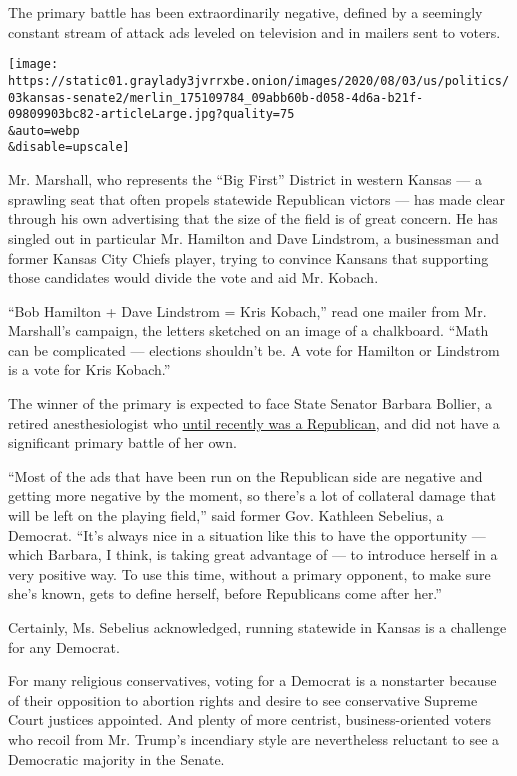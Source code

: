 The primary battle has been extraordinarily negative, defined by a
seemingly constant stream of attack ads leveled on television and in
mailers sent to voters.

\texttt{[image: https://static01.graylady3jvrrxbe.onion/images/2020/08/03/us/politics/03kansas-senate2/merlin\_175109784\_09abb60b-d058-4d6a-b21f-09809903bc82-articleLarge.jpg?quality=75\\\&auto=webp\\\&disable=upscale]}

Mr. Marshall, who represents the ``Big First'' District in western
Kansas --- a sprawling seat that often propels statewide Republican
victors --- has made clear through his own advertising that the size of
the field is of great concern. He has singled out in particular Mr.
Hamilton and Dave Lindstrom, a businessman and former Kansas City Chiefs
player, trying to convince Kansans that supporting those candidates
would divide the vote and aid Mr. Kobach.

``Bob Hamilton + Dave Lindstrom = Kris Kobach,'' read one mailer from
Mr. Marshall's campaign, the letters sketched on an image of a
chalkboard. ``Math can be complicated --- elections shouldn't be. A vote
for Hamilton or Lindstrom is a vote for Kris Kobach.''

The winner of the primary is expected to face State Senator Barbara
Bollier, a retired anesthesiologist who
\href{https://www.kansas.com/news/politics-government/article222990385.html}{until
recently was a Republican}, and did not have a significant primary
battle of her own.

``Most of the ads that have been run on the Republican side are negative
and getting more negative by the moment, so there's a lot of collateral
damage that will be left on the playing field,'' said former Gov.
Kathleen Sebelius, a Democrat. ``It's always nice in a situation like
this to have the opportunity --- which Barbara, I think, is taking great
advantage of --- to introduce herself in a very positive way. To use
this time, without a primary opponent, to make sure she's known, gets to
define herself, before Republicans come after her.''

Certainly, Ms. Sebelius acknowledged, running statewide in Kansas is a
challenge for any Democrat.

For many religious conservatives, voting for a Democrat is a nonstarter
because of their opposition to abortion rights and desire to see
conservative Supreme Court justices appointed. And plenty of more
centrist, business-oriented voters who recoil from Mr. Trump's
incendiary style are nevertheless reluctant to see a Democratic majority
in the Senate.

